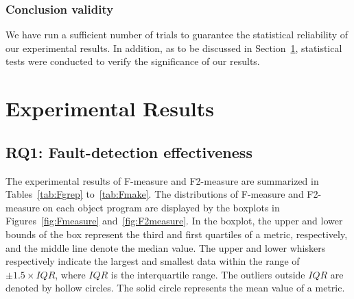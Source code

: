 \documentclass[10pt,journal,compsoc]{IEEEtran}
\begin{document}
\subsubsection{Conclusion validity}
We have run a sufficient number of trials to guarantee the statistical reliability of our experimental results. In addition, as to be discussed in Section~\ref{sec:results}, statistical tests were conducted to verify the significance of our results.

\section{Experimental Results}
\label{sec:results}

\subsection{RQ1: Fault-detection effectiveness}

The experimental results of F-measure and F2-measure are summarized in Tables~\ref{tab:Fgrep} to~\ref{tab:Fmake}. The distributions of F-measure and F2-measure on each object program are displayed by the boxplots in Figures~\ref{fig:Fmeasure} and~\ref{fig:F2measure}. In the boxplot, the upper and lower bounds of the box represent the third and first quartiles of a metric, respectively, and the middle line denote the median value. The upper and lower whiskers respectively indicate the largest and smallest data within the range of $\pm 1.5 \times IQR$, where $IQR$ is the interquartile range. The outliers outside $IQR$ are denoted by hollow circles. The solid circle represents the mean value of a metric.
\end{document}
